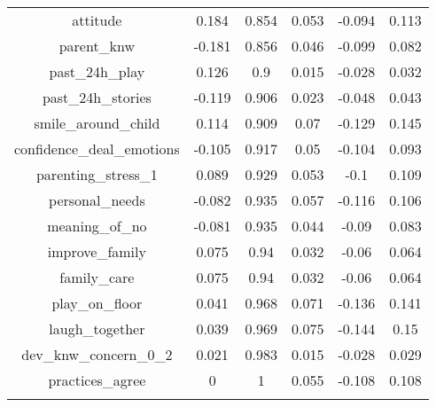 \begin{table}[!htbp]
\begin{tabular}{@{\extracolsep{5pt}} cccccc}
attitude & 0.184 & 0.854 & 0.053 & -0.094 & 0.113 \\ 
parent\_knw & -0.181 & 0.856 & 0.046 & -0.099 & 0.082 \\ 
past\_24h\_play & 0.126 & 0.9 & 0.015 & -0.028 & 0.032 \\ 
past\_24h\_stories & -0.119 & 0.906 & 0.023 & -0.048 & 0.043 \\ 
smile\_around\_child & 0.114 & 0.909 & 0.07 & -0.129 & 0.145 \\ 
confidence\_deal\_emotions & -0.105 & 0.917 & 0.05 & -0.104 & 0.093 \\ 
parenting\_stress\_1 & 0.089 & 0.929 & 0.053 & -0.1 & 0.109 \\ 
personal\_needs & -0.082 & 0.935 & 0.057 & -0.116 & 0.106 \\ 
meaning\_of\_no & -0.081 & 0.935 & 0.044 & -0.09 & 0.083 \\ 
improve\_family & 0.075 & 0.94 & 0.032 & -0.06 & 0.064 \\ 
family\_care & 0.075 & 0.94 & 0.032 & -0.06 & 0.064 \\ 
play\_on\_floor & 0.041 & 0.968 & 0.071 & -0.136 & 0.141 \\ 
laugh\_together & 0.039 & 0.969 & 0.075 & -0.144 & 0.15 \\ 
dev\_knw\_concern\_0\_2 & 0.021 & 0.983 & 0.015 & -0.028 & 0.029 \\ 
practices\_agree & 0 & 1 & 0.055 & -0.108 & 0.108 \\ 
\hline \\[-1.8ex] 
\end{tabular} 
\end{table} 
